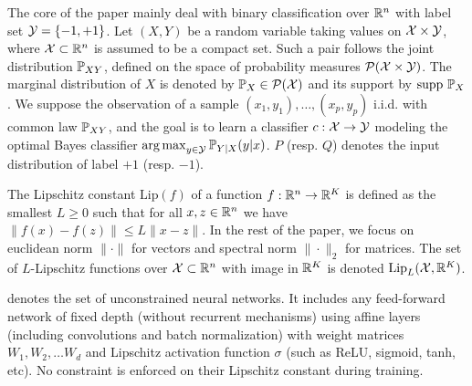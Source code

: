 The core of the paper mainly deal with  binary classification over $\mathbb{R}^n$ with label set $\mathcal{Y}=\{-1,+1\}$. Let $(X,Y)$ be a random variable taking values on $\mathcal{X}\times\mathcal{Y}$, where $\mathcal{X}\subset\mathbb{R}^n$ is assumed to be a compact set. Such a pair follows the joint distribution $\mathbb{P}_{XY}$, defined on the space of probability measures $\mathcal{P}(\mathcal{X}\times\mathcal{Y})$. The marginal distribution of $X$ is denoted by $\mathbb{P}_X\in\mathcal{P}(\mathcal{X})$ and its support by $\text{supp }\mathbb{P}_X$. We suppose the observation of a sample $(x_1,y_1), \dots, (x_p,y_p)$ i.i.d. with common law $\mathbb{P}_{XY}$, and the goal is to learn a classifier $c:\mathcal{X}\rightarrow\mathcal{Y}$ modeling the optimal Bayes classifier $\operatorname*{arg\,max}_{y\in\mathcal{Y}}\mathbb{P}_{Y|X}(y|x)$. $P$ (resp. $Q$) denotes the input distribution of label $+1$ (resp. $-1$).  
  
The Lipschitz constant $\text{Lip}(f)$ of a function $f:\mathbb{R}^n\rightarrow\mathbb{R}^K$ is defined as the smallest $L\geq 0$ such that for all $x,z\in\mathbb{R}^n$ we have $\|f(x)-f(z)\|\leq L\|x-z\|$. In the rest of the paper, we focus on euclidean norm $\|\cdot\|$ for vectors and spectral norm $\|\cdot\|_2$ for matrices. The set of $L$-Lipschitz functions over $\mathcal{X}\subset\mathbb{R}
^n$ with image in $\mathbb{R}^K$ is denoted $\text{Lip}_L(\mathcal{X},\mathbb{R}^K)$. %
  
\begin{definition}
\LipInf denotes the set of unconstrained neural networks. It includes any feed-forward network of fixed depth (without recurrent mechanisms) using affine layers (including convolutions and batch normalization) with weight matrices $W_1,W_2,\ldots W_d$ %
and Lipschitz activation function $\sigma$ (such as ReLU, sigmoid, tanh, etc). No constraint is enforced on their Lipschitz constant during training.  
\end{definition}

